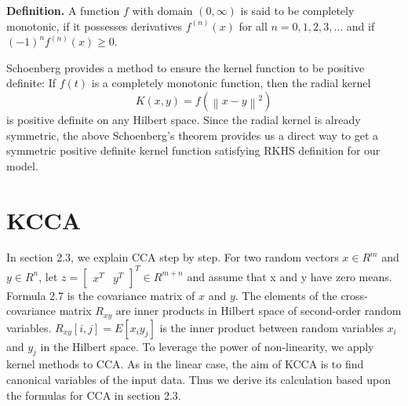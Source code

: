 \documentclass[12pt]{report} %
\newcommand{\norm}[1]{\left\lVert #1 \right\rVert}
\begin{document}
\textbf{Definition.} A function $f$ with domain $(0, \infty)$ is said to be completely monotonic, if it possesses derivatives $f^{(n)}(x)$ for all $n=0,1,2,3,...$ and if $(-1)^nf^{(n)}(x) \geq 0$\cite{CMF}. 

Schoenberg\cite{Schoenberg} provides a method to ensure the kernel function to be positive definite: If \(f(t)\) is a completely monotonic function, then the radial kernel
\begin{equation}
K(x,y)=f(\norm{x-y}^2)
\end{equation}
is positive definite on any Hilbert space. Since the radial kernel is already symmetric, the above Schoenberg's theorem provides us a direct way to get a symmetric positive definite kernel function satisfying RKHS definition for our model.

\section{KCCA}
In section 2.3, we explain CCA step by step. For two random vectors $x\in R^{m}$ and $y\in R^{n}$, let $z= \begin{bmatrix}x^T & y^T\end{bmatrix}^T \in R^{m+n}$ and assume that x and y have zero means. Formula 2.7 is the covariance matrix of $x$ and $y$. The elements of the cross-covariance matrix $R_{xy}$ are inner products in Hilbert space of second-order random variables. $R_{xy}[i,j]=E[x_{i}y_{j}]$ is the inner product between random variables $x_{i}$ and $y_{j}$ in the Hilbert space. To leverage the power of non-linearity, we apply kernel methods to CCA. As in the linear case, the aim of KCCA is to find canonical variables of the input data. Thus we derive its calculation based upon the formulas for CCA in section 2.3. 
\end{document}
